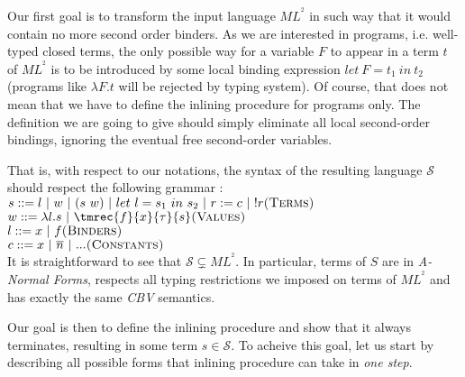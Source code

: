 \documentclass[a4paper,11pt,oneside]{article}
\theoremstyle{plain}
\newcommand{\tmlet}[3]{let~#1=#2~in~#3}
\newcommand{\inlS}{\mathcal{S}}
\newcommand{\inlsrc}{\textit{ML}^{^2}}
\newcommand{\inlT}{\inlsrc}
\begin{document}
Our first goal is to transform the input language $\inlT$ in such way that it
would contain no more second order binders. As we are interested in programs, 
i.e. well-typed closed terms, the only possible way for a variable $F$ to 
appear in a term $t$ of $\inlT$ is to be introduced by some local binding 
expression $\tmlet{F}{t_1}{t_2}$ (programs like $\lambda F. t$ will be
rejected by typing system). Of course, that does not mean that we have to define 
the inlining procedure for programs only. The definition we are going to give
should simply eliminate all local second-order bindings, ignoring the eventual
free second-order variables.

That is, with respect to our notations, the syntax of the resulting language
 $\inlS$ should respect the following grammar :\\[1em]\indent 
  $ s ::= l~|~w~|~(s~w) ~|~ \tmlet{l}{s_1}{s_2} ~|~ r:= c ~|~ !r \hfill \textsc{(Terms)}$ \\\indent 
  $ w ::= \lambda l. s ~|~ \tmrec{f}{x}{\tau}{s}\hfill \textsc{(Values)}$ \\\indent 
  $ l ::= x ~|~ f \hfill \textsc{(Binders)}$ \\\indent 
  $ c ::= x ~|~ \overline{n}~|~... \hfill \textsc{(Constants)}$\\[1em]

It is straightforward to see that $\inlS \subsetneq \inlT$. In particular,
terms of $S$ are in \textit{A-Normal Forms}, respects all typing restrictions 
we imposed on terms of $\inlT$ and has exactly the same \textit{CBV} semantics. 

Our goal is then to define the inlining procedure and show that it always
terminates, resulting in some term $s \in \inlS$.
To acheive this goal, let us start by describing all possible forms that
inlining procedure can take in \textit{one step}.
\end{document}
